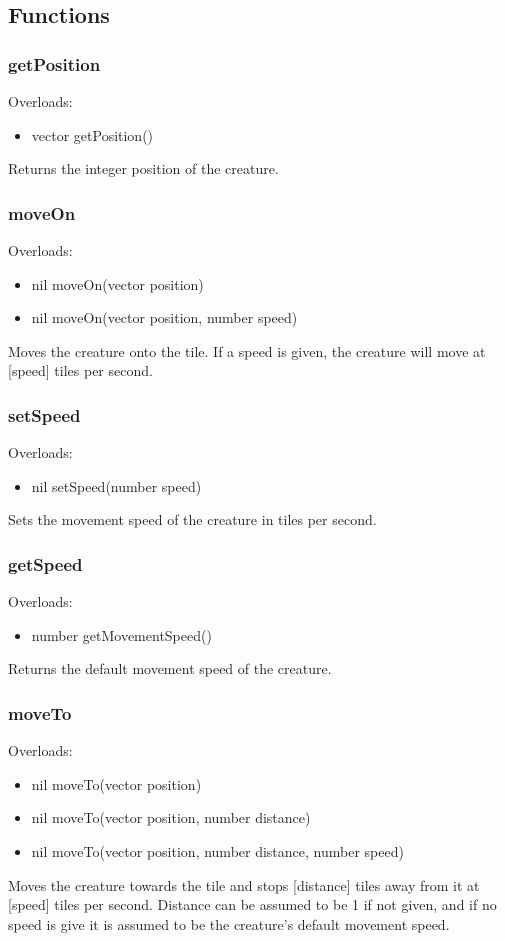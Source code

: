 \documentclass{book}
\newenvironment{ulist}
	{\begin{itemize}
			\itemsep0em}
	{\end{itemize}}
\begin{document}
\subsection{Functions}
\subsubsection{getPosition}
Overloads:
\begin{ulist}
	\item vector getPosition()
\end{ulist}
Returns the integer position of the creature.

\subsubsection{moveOn}
Overloads:
\begin{ulist}
	\item nil moveOn(vector position)
	\item nil moveOn(vector position, number speed)
\end{ulist}
Moves the creature onto the tile. If a speed is given, the creature will move at [speed] tiles per second.

\subsubsection{setSpeed}
Overloads:
\begin{ulist}
	\item nil setSpeed(number speed)
\end{ulist}
Sets the movement speed of the creature in tiles per second.

\subsubsection{getSpeed}
Overloads:
\begin{ulist}
	\item number getMovementSpeed()
\end{ulist}
Returns the default movement speed of the creature.

\subsubsection{moveTo}
Overloads:
\begin{ulist}
	\item nil moveTo(vector position)
	\item nil moveTo(vector position, number distance)
	\item nil moveTo(vector position, number distance, number speed)
\end{ulist}
Moves the creature towards the tile and stops [distance] tiles away from it at [speed] tiles per second. Distance can be assumed to be 1 if not given, and if no speed is give it is assumed to be the creature's default movement speed.
\end{document}
